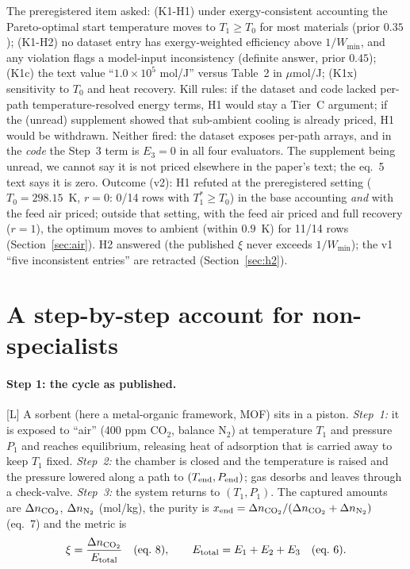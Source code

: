 \documentclass[10pt]{article}
\newcommand{\tier}[1]{\textsf{[#1]}}
\newcommand{\tL}{\tier{L}}
\newcommand{\umolJ}{\ensuremath{\mu}mol/J}
\begin{document}
The preregistered item asked: (K1-H1) under exergy-consistent accounting the Pareto-optimal start temperature moves to $T_1\ge T_0$ for most materials (prior $0.35$);
(K1-H2) no dataset entry has exergy-weighted efficiency above $1/W_{\min}$, and any violation flags a model-input inconsistency (definite answer, prior $0.45$);
(K1c) the text value ``$1.0\times10^5$ mol/J'' versus Table~2 in \umolJ{}; (K1x) sensitivity to $T_0$ and heat recovery.
Kill rules: if the dataset and code lacked per-path temperature-resolved energy terms, H1 would stay a Tier~C argument; if the (unread) supplement showed that
sub-ambient cooling is already priced, H1 would be withdrawn. Neither fired: the dataset exposes per-path arrays, and in the \emph{code} the Step~3 term is $E_3=0$ in all four evaluators. The supplement being unread, we cannot say it is not
priced elsewhere in the paper's text; the eq.~5 text says it is zero.
Outcome (v2): H1 refuted at the preregistered setting ($T_0=298.15$~K, $r=0$: 0/14 rows with $T_1^\ast\ge T_0$) in the base accounting \emph{and} with the feed air priced; outside that setting, with the feed air priced and full recovery ($r=1$), the optimum moves to ambient (within $0.9$~K) for 11/14 rows (Section~\ref{sec:air}). H2 answered (the published $\xi$ never exceeds $1/W_{\min}$); the v1 ``five inconsistent entries'' are retracted (Section~\ref{sec:h2}).

\section{A step-by-step account for non-specialists}\label{sec:human}
\paragraph{Step 1: the cycle as published.}\tL{} A sorbent (here a metal-organic framework, MOF) sits in a piston. \emph{Step~1:} it is exposed to ``air'' (400 ppm CO$_2$, balance N$_2$) at
temperature $T_1$ and pressure $P_1$ and reaches equilibrium, releasing heat of adsorption that is carried away to keep $T_1$ fixed. \emph{Step~2:} the chamber is closed and the temperature is raised and the
pressure lowered along a path to $(T_{\rm end},P_{\rm end})$; gas desorbs and leaves through a check-valve. \emph{Step~3:} the system returns to $(T_1,P_1)$. The captured amounts
are $\Delta n_{\rm CO_2}$, $\Delta n_{\rm N_2}$ (mol/kg), the purity is $x_{\rm end}=\Delta n_{\rm CO_2}/(\Delta n_{\rm CO_2}+\Delta n_{\rm N_2})$ (eq.~7) and the metric is
\[\xi=\frac{\Delta n_{\rm CO_2}}{E_{\rm total}}\quad(\text{eq.~8}),\qquad E_{\rm total}=E_1+E_2+E_3\quad(\text{eq.~6}).\]
\end{document}
